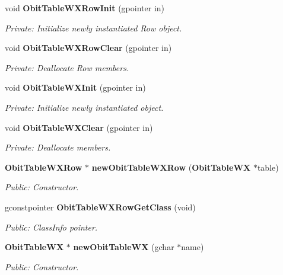 \begin{CompactItemize}
\item 
void {\bf Obit\-Table\-WXRow\-Init} (gpointer in)
\begin{CompactList}\small\item\em Private: Initialize newly instantiated Row object. \item\end{CompactList}\item 
void {\bf Obit\-Table\-WXRow\-Clear} (gpointer in)
\begin{CompactList}\small\item\em Private: Deallocate Row members. \item\end{CompactList}\item 
void {\bf Obit\-Table\-WXInit} (gpointer in)
\begin{CompactList}\small\item\em Private: Initialize newly instantiated object. \item\end{CompactList}\item 
void {\bf Obit\-Table\-WXClear} (gpointer in)
\begin{CompactList}\small\item\em Private: Deallocate members. \item\end{CompactList}\item 
{\bf Obit\-Table\-WXRow} $\ast$ {\bf new\-Obit\-Table\-WXRow} ({\bf Obit\-Table\-WX} $\ast$table)
\begin{CompactList}\small\item\em Public: Constructor. \item\end{CompactList}\item 
gconstpointer {\bf Obit\-Table\-WXRow\-Get\-Class} (void)
\begin{CompactList}\small\item\em Public: Class\-Info pointer. \item\end{CompactList}\item 
{\bf Obit\-Table\-WX} $\ast$ {\bf new\-Obit\-Table\-WX} (gchar $\ast$name)
\begin{CompactList}\small\item\em Public: Constructor. \item\end{CompactList}\item 

\end{CompactItemize}
